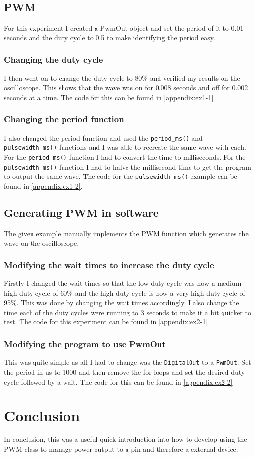 \documentclass[a4paper,12pt]{scrartcl}
\begin{document}
	{
		\subsection{PWM}
		{
			For this experiment I created a PwmOut object and set the period of it to 0.01 seconds and the duty cycle to 0.5 to make identifying the period easy.
			\subsubsection{Changing the duty cycle}
			{
				I then went on to change the duty cycle to 80\% and verified my results on the oscilloscope. This shows that the wave was on for 0.008 seconds and off for 0.002 seconds at a time. The code for this can be found in \cref{appendix:ex1-1}
			}
			\subsubsection{Changing the period function}
			{
				I also changed the period function and used the \lstinline|period_ms()| and \lstinline|pulsewidth_ms()| functions and I was able to recreate the same wave with each. For the \lstinline|period_ms()| function I had to convert the time to milliseconds. For the \lstinline|pulsewidth_ms()| function I had to halve the millisecond time to get the program to output the same wave. The code for the \lstinline|pulsewidth_ms()| example can be found in \cref{appendix:ex1-2}.
			}
		}
		\subsection{Generating PWM in software}
		{
			The given example manually implements the PWM function which generates the wave on the oscilloscope.
			\subsubsection{Modifying the wait times to increase the duty cycle}
			{
				Firstly I changed the wait times so that the low duty cycle was now a medium high duty cycle of 60\% and the high duty cycle is now a very high duty cycle of 95\%. This was done by changing the wait times accordingly. I also change the time each of the duty cycles were running to 3 seconds to make it a bit quicker to test. The code for this experiment can be found in \cref{appendix:ex2-1}
			}
			\subsubsection{Modifying the program to use PwmOut}
			{
				This was quite simple as all I had to change was the \lstinline|DigitalOut| to a \lstinline|PwmOut|. Set the period in us to 1000 and then remove the for loops and set the desired duty cycle followed by a wait. The code for this can be found in \cref{appendix:ex2-2}
			}
		}
	}

	\section{Conclusion}
	{
		In conclusion, this was a useful quick introduction into how to develop using the PWM class to manage power output to a pin and therefore a external device.
	}
	\printbibliography[heading=bibintoc,title=References]
	\newpage
	
\end{document}
